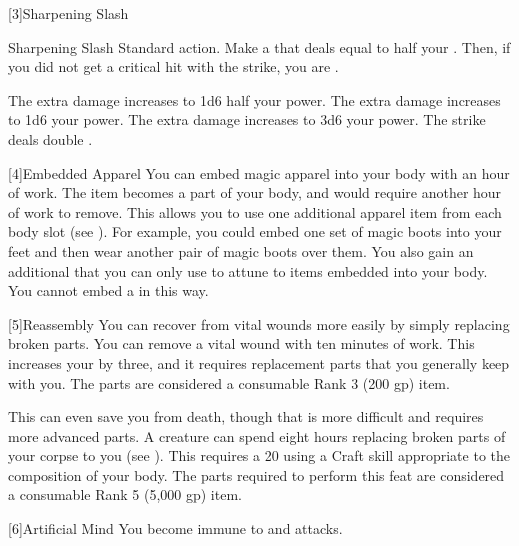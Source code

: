     [3]{Sharpening Slash}
    \begin{activeability}{Sharpening Slash}
        \abilityusagetime Standard action.
        \rankline
        Make a  that deals  equal to half your .
        Then, if you did not get a critical hit with the strike, you are  \honed.

        \rankline
         The extra damage increases to 1d6 \add half your power.
         The extra damage increases to 1d6 \add your power.
         The extra damage increases to 3d6 \add your power.
         The strike deals double .
    \end{activeability}

    [4]{Embedded Apparel} You can embed magic apparel into your body with an hour of work.
      The item becomes a part of your body, and would require another hour of work to remove.
      This allows you to use one additional apparel item from each body slot (see ).
      For example, you could embed one set of magic boots into your feet and then wear another pair of magic boots over them.
      You also gain an additional  that you can only use to attune to items embedded into your body.
      You cannot embed a  in this way.

    [5]{Reassembly} You can recover from vital wounds more easily by simply replacing broken parts.
      You can remove a vital wound with ten minutes of work.
      This increases your  by three, and it requires replacement parts that you generally keep with you.
      The parts are considered a consumable Rank 3 (200 gp) item.

      This can even save you from death, though that is more difficult and requires more advanced parts.
      A creature can spend eight hours replacing broken parts of your corpse to  you (see ).
      This requires a  20  using a Craft skill appropriate to the composition of your body.
      The parts required to perform this feat are considered a consumable Rank 5 (5,000 gp) item.

    [6]{Artificial Mind} You become immune to  and  attacks.

